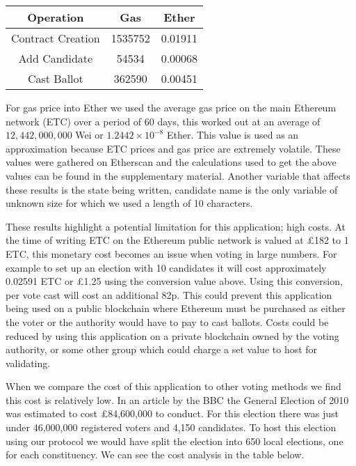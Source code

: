 \documentclass{entcs}
\begin{document}
\begin{table}[h!]
\centering
\begin{tabular}{|c c c|}
 \hline
 Operation & Gas & Ether \\ 
 \hline
 Contract Creation & 1535752 & 0.01911 \\  
 Add Candidate & 54534 & 0.00068 \\  
 Cast Ballot & 362590 & 0.00451 \\  
 \hline
\end{tabular}
\end{table}

For gas price into Ether we used the average gas price on the main Ethereum network (ETC) over a period of 60 days, this worked out at an average of \(12,442,000,000\) Wei or \(1.2442 \times 10^{-8}\) Ether. This value is used as an approximation because ETC prices and gas price are extremely volatile. These values were gathered on Etherscan \cite{gasprice} and the calculations used to get the above values can be found in the supplementary material. Another variable that affects these results is the state being written, candidate name is the only variable of unknown size for which we used a length of 10 characters.

These results highlight a potential limitation for this application; high costs. At the time of writing ETC on the Ethereum public network is valued at \pounds182 to 1 ETC, this monetary cost becomes an issue when voting in large numbers. For example to set up an election with 10 candidates it will cost approximately 0.02591 ETC or \pounds1.25 using the conversion value above. Using this conversion, per vote cast will cost an additional 82p. This could prevent this application being used on a public blockchain where Ethereum must be purchased as either the voter or the authority would have to pay to cast ballots. Costs could be reduced by using this application on a private blockchain owned by the voting authority, or some other group which could charge a set value to host for validating. 

When we compare the cost of this application to other voting methods we find this cost is relatively low. In an article by the BBC \cite{costOfGE} the General Election of 2010 was estimated to cost \pounds84,600,000 to conduct. For this election there was just under 46,000,000 registered voters and 4,150 candidates. To host this election using our protocol we would have split the election into 650 local elections, one for each constituency. We can see the cost analysis in the table below.
\end{document}
